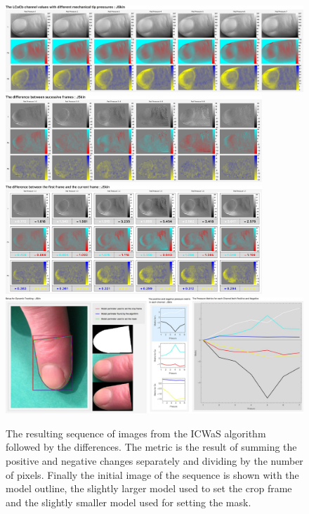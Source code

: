 \begin{figure}[h!]
  \centering
    \includegraphics[width=1.00\textwidth]{Chapter4/Figs/Final_Fig_Channels_JSkin.jpg}
    \includegraphics[width=0.86\textwidth]{Chapter4/Figs/Final_Fig_Difference_JSkin.jpg}
    \includegraphics[width=0.86\textwidth]{Chapter4/Figs/Final_Fig_Total_Difference_JSkin.jpg}
    \includegraphics[width=1.00\textwidth]{Chapter4/Figs/Final_Fig_Misc_JSkin.jpg}
    \caption{The resulting sequence of images from the ICWaS algorithm followed by the differences. The metric is the result of summing the positive and negative changes separately and dividing by the number of pixels. Finally the initial image of the sequence is shown with the model outline, the slightly larger model used to set the crop frame and the slightly smaller model used for setting the mask.}\label{fig:ICWaSResultJSkin}
\end{figure}


